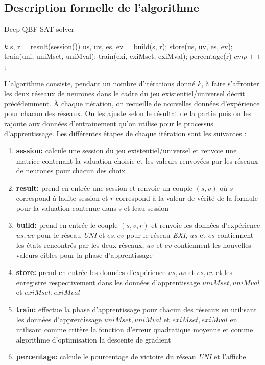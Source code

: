 \documentclass{article}
\begin{document}
\subsection{Description formelle de l'algorithme}
	\begin{algorithm}
	\caption{Deep QBF-SAT solver}
	\begin{algorithmic}
	\REQUIRE  $k$ 
	\STATE  s, r = result(session())
	\STATE  us, uv, es, ev = build(s, r);
	\STATE store(us, uv, es, ev);
	\STATE train(uni, uniMset, uniMval);
	\STATE train(exi, exiMset, exiMval);
	\STATE percentage(r)
	\STATE $cmp++$;
	\ENDWHILE
	\end{algorithmic}
	\end{algorithm}
	L'algorithme consiste, pendant un nombre d'itérations donné $k$, à faire s'affronter les deux réseaux de neurones dans le cadre du jeu existentiel/universel décrit précédemment. À chaque itération, on recueille de nouvelles données d'expérience pour chacun des réseaux. On les ajuste selon le résultat de la partie puis on les rajoute aux données d'entrainement qu'on utilise pour le processus d'apprentissage.
	Les différentes étapes de chaque itération sont les suivantes :
	\begin{enumerate}
	\item \textbf{session:} calcule une session du jeu existentiel/universel et renvoie une matrice contenant la valuation choisie et les valeurs renvoyées par les réseaux de neurones pour chacun des choix
	\item \textbf{result:} prend en entrée une session et renvoie un couple $(s,v)$ où $s$ correspond à ladite session et $r$ correspond à la valeur de vérité de la formule pour la valuation contenue dans s et leau session
	\item \textbf{build:} prend en entrée le couple $(s,v,r)$ et renvoie les données d'expérience $us,uv$ pour le réseau \textit{UNI} et $es,ev$ pour le réseau \textit{EXI}, $us$ et $es$ contiennent les états rencontrés par les deux réseaux, $uv$ et $ev$ contiennent les nouvelles valeurs cibles pour la phase d'apprentissage
	\item \textbf{store:} prend en entrée les données d'expérience $us,uv$ et $es,ev$ et les enregistre respectivement dans les données d'apprentissage $uniMset, uniMval$ et $exiMset, exiMval$  
	\item \textbf{train:} effectue la phase d'apprentissage pour chacun des réseaux en utilisant les données d'apprentissage $uniMset, uniMval$ et $exiMset, exiMval$ en utilisant comme critère la fonction d'erreur quadratique moyenne et comme algorithme d'optimisation la descente de gradient
	\item \textbf{percentage:} calcule le pourcentage de victoire du réseau \textit{UNI} et l'affiche
	\end{enumerate}
	
\end{document}
